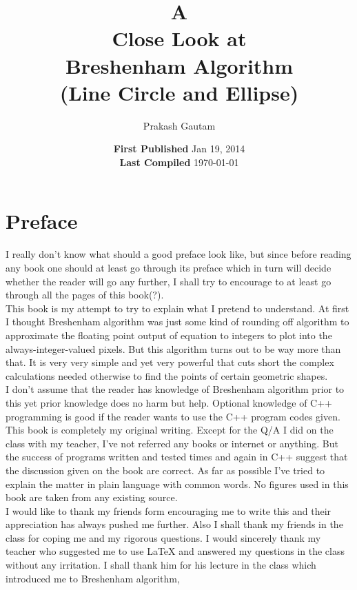 \documentclass[a4paper,12pt,oneside]{book}
\author{Prakash Gautam}
\title{\Huge \vfill A\\Close Look at\\ Breshenham Algorithm\\  \small (Line Circle and Ellipse)}
\date{\vfill \textbf{First Published} Jan 19, 2014 \\ \textbf{Last Compiled}  \today}
\begin{document}
\begin{titlepage}
	\begin{center}
		\maketitle
 		\vfill
	\end{center}
\end{titlepage}
 
\tableofcontents
\vfill
\pagebreak



\section*{Preface}

I really don't know what should a good preface look like, but since before reading any book one should at least go through its preface which in turn will decide whether the reader will go any further, I shall try to encourage to at least go through all the pages of this book(?).\\

This book is my attempt to try to explain what I pretend to understand. At first I thought Breshenham algorithm was just some kind of rounding off algorithm to approximate the floating point output of equation to integers to plot into the always-integer-valued pixels. But this algorithm turns out to be way more than that. It is very very simple and yet very powerful that cuts short the complex calculations needed otherwise to find the points of certain geometric shapes.\\

I don't assume that the reader has knowledge of Breshenham algorithm prior to this yet prior knowledge does no harm but help. Optional knowledge of C++ programming is good if the reader wants to use the C++ program codes given.
\\ This book is completely my original writing. Except for the Q/A I did on the class with my teacher, I've not referred any books or internet or anything. But the success of programs written and tested times and again in C++ suggest that the discussion given on the book are correct. As far as possible I've tried to explain the matter in plain language with common words. No figures  used in this book are taken from any existing source.\\

I would like to thank my friends form encouraging me to write this and their appreciation has always pushed me further. Also I shall thank my friends in the class for coping me and my rigorous questions. I would sincerely thank my teacher who suggested me to use {\LaTeX} and answered my questions in the class without any irritation. I shall thank him for his lecture in the class which introduced me to Breshenham algorithm,\\
\end{document}
